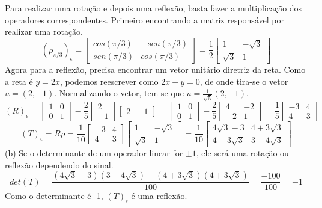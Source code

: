 \documentclass{homework}
\begin{document}
\exercise*
Para realizar uma rotação e depois uma reflexão, basta fazer a multiplicação dos operadores correspondentes. Primeiro encontrando a matriz responsável por realizar uma rotação.
\[(\rho_{\pi/3})_\epsilon = 
\begin{bmatrix}
cos(\pi/3) & -sen(\pi/3)\\
sen(\pi/3) & cos(\pi/3)
\end{bmatrix} = \frac{1}{2}
\begin{bmatrix}
1 & -\sqrt{3}\\
\sqrt{3} & 1
\end{bmatrix}\]
Agora para a reflexão, precisa encontrar um vetor unitário diretriz da reta. Como a reta é $y = 2x$, podemos reescrever como $2x - y = 0$, de onde tira-se o vetor $u = (2,-1)$. Normalizando o vetor, tem-se que $u = \frac{1}{\sqrt{5}}(2,-1)$.
\[(R)_\epsilon = \begin{bmatrix}
1 & 0\\
0 & 1
\end{bmatrix} - \frac{2}{5}
\begin{bmatrix}
2\\
-1
\end{bmatrix}
\begin{bmatrix}
2 & -1
\end{bmatrix} = 
\begin{bmatrix}
1 & 0\\
0 & 1
\end{bmatrix} - \frac{2}{5}
\begin{bmatrix}
4 & -2\\
-2 & 1
\end{bmatrix} = \frac{1}{5}
\begin{bmatrix}
-3 & 4\\
4 & 3
\end{bmatrix}\]
\[(T)_\epsilon = R\rho = \frac{1}{10}
\begin{bmatrix}
-3 & 4\\
4 & 3
\end{bmatrix}
\begin{bmatrix}
1 & -\sqrt{3}\\
\sqrt{3} & 1
\end{bmatrix} = \frac{1}{10}
\begin{bmatrix}
4\sqrt{3} - 3 & 4 + 3\sqrt{3}\\
4 + 3\sqrt{3} & 3 - 4\sqrt{3}
\end{bmatrix}\]
(b) Se o determinante de um operador linear for $\pm1$, ele será uma rotação ou reflexão dependendo do sinal.
\[det(T) = \frac{(4\sqrt{3}-3)(3-4\sqrt{3}) - (4+3\sqrt{3})(4+3\sqrt{3})}{100} = \frac{-100}{100} = -1\]
Como o determinante é -1, $(T)_\epsilon$ é uma reflexão.
\end{document}
